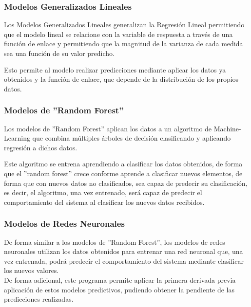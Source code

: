 \subsubsection*{Modelos Generalizados Lineales}

Los Modelos Generalizados Lineales generalizan la Regresión Lineal permitiendo que
el modelo lineal se relacione con la variable de respuesta a través de una función
de enlace y permitiendo que la magnitud de la varianza de cada medida sea una función
de su valor predicho.

Esto permite al modelo realizar predicciones mediante aplicar los datos ya obtenidos
y la función de enlace, que depende de la distribución de los propios datos.

\subsubsection*{Modelos de ''Random Forest''}

Los modelos de ''Random Forest'' aplican los datos a un algoritmo de Machine-Learning 
que combina múltiples árboles de decisión clasificando y aplicando regresión a dichos
datos.

Este algoritmo se entrena aprendiendo a clasificar los datos obtenidos, de forma
que el ''random forest'' crece conforme aprende a clasificar nuevos elementos, de 
forma que con nuevos datos no clasificados, sea capaz de predecir su clasificación,
es decir, el algoritmo, una vez entrenado, será capaz de predecir el comportamiento
del sistema al clasificar los nuevos datos recibidos.

\subsubsection*{Modelos de Redes Neuronales}

De forma similar a los modelos de ''Random Forest'', los modelos de redes neuronales
utilizan los datos obtenidos para entrenar una red neuronal que, una vez entrenada,
podrá predecir el comportamiento del sistema mediante clasificar los nuevos valores.\\


De forma adicional, este programa permite aplicar la primera derivada previa aplicación 
de estos modelos predictivos, pudiendo obtener la pendiente de las predicciones 
realizadas.



